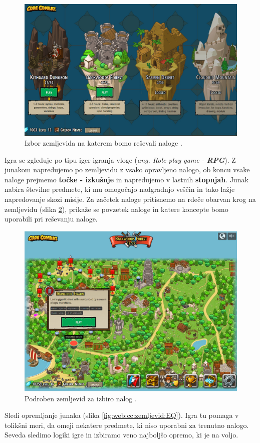 \begin{figure}[h!]
  \centering
    \includegraphics [width=0.65\linewidth, keepaspectratio =
   1] {./images/sc_web/cc_izbor-zem-v01.jpg}
   \caption{Izbor zemljevida na katerem bomo reševali naloge
     \cite{web:codecombat}.}
   \label{fig:web:cc:zemljevid}
 \end{figure}

 Igra se zgleduje po tipu iger igranja vloge (\emph{ang. Role play
   game - \textbf{RPG}}). Z junakom napredujemo po zemljevidu z vsako
 opravljeno nalogo, ob koncu vsake naloge prejmemo \textbf{točke -
   izkušnje} in napredujemo v lastnih \textbf{stopnjah}. Junak nabira
 številne predmete, ki mu omogočajo nadgradnjo veščin in tako lažje
 napredovanje skozi misije. Za začetek naloge pritisnemo na rdeče
 obarvan krog na zemljevidu (slika \ref{fig:web:cc:zemljevid:BG}),
 prikaže se povzetek naloge in katere koncepte bomo uporabili pri
 reševanju naloge. 

\begin{figure}[h!]
  \centering
    \includegraphics [width=0.65\linewidth, keepaspectratio =
   1] {./images/sc_web/cc_izbor-zem-BG-v01.jpg}
   \caption{Podroben zemljevid za izbiro nalog \cite{web:codecombat}.}
   \label{fig:web:cc:zemljevid:BG}
 \end{figure}

 Sledi opremljanje junaka (slika \ref{fig:web:cc:zemljevid:EQ}). Igra
 tu pomaga v tolikšni meri, da omeji nekatere predmete, ki niso
 uporabni za trenutno nalogo. Seveda sledimo logiki igre in izbiramo
 veno najboljšo opremo, ki je na voljo.
 
